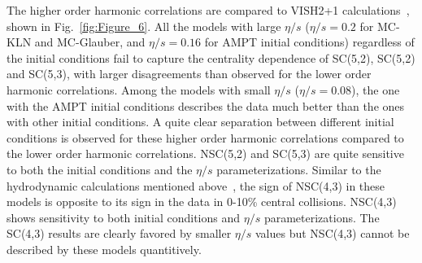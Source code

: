 The higher order harmonic correlations are compared to VISH2+1 calculations~\cite{Zhu:2016puf}, shown in Fig.~\ref{fig:Figure_6}. 
All the models with large $\eta/s$ ($\eta/s=0.2$ for MC-KLN and MC-Glauber, and $\eta/s=0.16$ for AMPT initial conditions) regardless of the initial conditions fail to capture the centrality dependence of SC(5,2), SC(5,2) and SC(5,3), with larger disagreements than observed for the lower order harmonic correlations.
Among the models with small $\eta/s$ ($\eta/s=0.08$), the one with the AMPT initial conditions describes the data much better than the ones with other initial conditions. 
A quite clear separation between different initial conditions is observed for these higher order harmonic correlations compared to the lower order harmonic correlations.
NSC(5,2) and SC(5,3) are quite sensitive to both the initial conditions and the $\eta/s$ parameterizations.
Similar to the hydrodynamic calculations mentioned above~\cite{Niemi:2015qia}, the sign of NSC(4,3) in these models is opposite to its sign in the data in 0-10\% central collisions. NSC(4,3) shows sensitivity to both initial conditions and $\eta/s$ parameterizations.
The SC(4,3) results are clearly favored by smaller $\eta/s$ values but NSC(4,3) cannot be described by these models quantitively.
     
